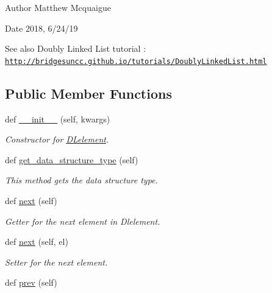 \begin{DoxyAuthor}{Author}
Matthew Mcquaigue 
\end{DoxyAuthor}
\begin{DoxyDate}{Date}
2018, 6/24/19
\end{DoxyDate}
\begin{DoxySeeAlso}{See also}
Doubly Linked List tutorial \+: \href{http://bridgesuncc.github.io/tutorials/DoublyLinkedList.html}{\tt http\+://bridgesuncc.\+github.\+io/tutorials/\+Doubly\+Linked\+List.\+html} 
\end{DoxySeeAlso}
\subsection*{Public Member Functions}
\begin{DoxyCompactItemize}
\item 
def \mbox{\hyperlink{classbridges_1_1dl__element_1_1_d_lelement_a1ade3543dee3c48d6030125b37f993bb}{\+\_\+\+\_\+init\+\_\+\+\_\+}} (self, kwargs)
\begin{DoxyCompactList}\small\item\em Constructor for \mbox{\hyperlink{classbridges_1_1dl__element_1_1_d_lelement}{D\+Lelement}}. \end{DoxyCompactList}\item 
def \mbox{\hyperlink{classbridges_1_1dl__element_1_1_d_lelement_a5fb177ed67b75e606ac303f7a972d301}{get\+\_\+data\+\_\+structure\+\_\+type}} (self)
\begin{DoxyCompactList}\small\item\em This method gets the data structure type. \end{DoxyCompactList}\item 
def \mbox{\hyperlink{classbridges_1_1dl__element_1_1_d_lelement_a43077e810ec453c9cd512ba75819e28a}{next}} (self)
\begin{DoxyCompactList}\small\item\em Getter for the next element in Dlelement. \end{DoxyCompactList}\item 
def \mbox{\hyperlink{classbridges_1_1dl__element_1_1_d_lelement_ae46f630cd7384689d4305770e6b2c7c1}{next}} (self, el)
\begin{DoxyCompactList}\small\item\em Setter for the next element. \end{DoxyCompactList}\item 
def \mbox{\hyperlink{classbridges_1_1dl__element_1_1_d_lelement_a66e7c4bfb2216a68744fe58c24e9917f}{prev}} (self)

\end{DoxyCompactItemize}
